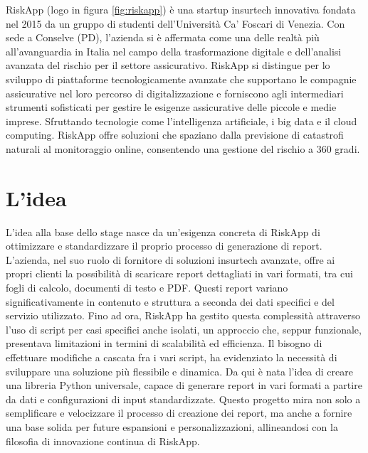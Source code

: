 RiskApp (logo in figura \ref{fig:riskapp}) è una startup insurtech innovativa fondata nel 2015 da un gruppo di studenti dell'Università Ca' Foscari di Venezia. Con sede a Conselve (PD), l'azienda si è affermata come una delle realtà più all'avanguardia in Italia nel campo della trasformazione digitale e dell'analisi avanzata del rischio per il settore assicurativo. RiskApp si distingue per lo sviluppo di piattaforme tecnologicamente avanzate che supportano le compagnie assicurative nel loro percorso di digitalizzazione e forniscono agli intermediari strumenti sofisticati per gestire le esigenze assicurative delle piccole e medie imprese. Sfruttando tecnologie come l'intelligenza artificiale, i big data e il cloud computing. RiskApp offre soluzioni che spaziano dalla previsione di catastrofi naturali al monitoraggio online, consentendo una gestione del rischio a 360 gradi.





\section{L'idea}
L'idea alla base dello stage nasce da un'esigenza concreta di RiskApp di ottimizzare e standardizzare il proprio processo di generazione di report. L'azienda, nel suo ruolo di fornitore di soluzioni insurtech avanzate, offre ai propri clienti la possibilità di scaricare report dettagliati in vari formati, tra cui fogli di calcolo, documenti di testo e PDF. Questi report variano significativamente in contenuto e struttura a seconda dei dati specifici e del servizio utilizzato. Fino ad ora, RiskApp ha gestito questa complessità attraverso l'uso di script per casi specifici anche isolati, un approccio che, seppur funzionale, presentava limitazioni in termini di scalabilità ed efficienza. Il bisogno di effettuare modifiche a cascata fra i vari script, ha evidenziato la necessità di sviluppare una soluzione più flessibile e dinamica. Da qui è nata l'idea di creare una libreria Python universale, capace di generare report in vari formati a partire da dati e configurazioni di input standardizzate. Questo progetto mira non solo a semplificare e velocizzare il processo di creazione dei report, ma anche a fornire una base solida per future espansioni e personalizzazioni, allineandosi con la filosofia di innovazione continua di RiskApp.

